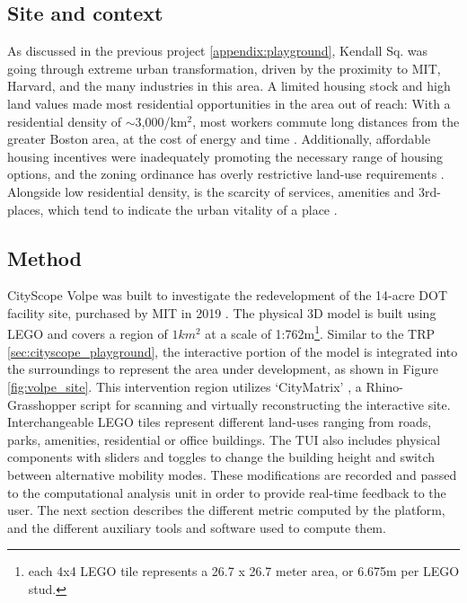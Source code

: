 {    \subsection{Site and context}
    {
        As discussed in the previous project \eqref{appendix:playground}, Kendall Sq. was going through extreme urban transformation, driven by the proximity to MIT, Harvard, and the many industries in this area. A limited housing stock and high land values made most residential opportunities in the area out of reach: With a residential density of $\sim$3,000/km$^2$, most workers commute long distances from the greater Boston area, at the cost of energy and time \cite{blanding_blanding_2016}. Additionally, affordable housing incentives were inadequately promoting the necessary range of housing options, and the zoning ordinance has overly restrictive land-use requirements \cite{noyman2015powerstructures}. Alongside low residential density, is the scarcity of services, amenities and 3rd-places, which tend to indicate the urban vitality of a place \cite{Glaeser2011, banerjee2011companion}.
    }

    \subsection{Method} \label{subsec:vople_cityscope}

    {
        CityScope Volpe was built to investigate the redevelopment of the 14-acre DOT facility site, purchased by MIT in 2019 \cite{mit_news}. The physical 3D model is built using LEGO and covers a region of $1km^2$ at a scale of 1:762m\footnote{each 4x4 LEGO tile represents a 26.7 x 26.7 meter area, or 6.675m per LEGO stud.}. Similar to the TRP \eqref{sec:cityscope_playground}, the interactive portion of the model is integrated into the surroundings to represent the area under development, as shown in Figure \eqref{fig:volpe_site}. This intervention region utilizes `CityMatrix' \cite{zhang2017citymatrix}, a Rhino-Grasshopper script \cite{TheHisto40:online} for scanning and virtually reconstructing the interactive site. Interchangeable LEGO tiles represent different land-uses ranging from roads, parks, amenities, residential or office buildings. The TUI also includes physical components with sliders and toggles to change the building height and switch between alternative mobility modes. These modifications are recorded and passed to the computational analysis unit in order to provide real-time feedback to the user. The next section describes the different metric computed by the platform, and the different auxiliary tools and software used to compute them.
    }


}
